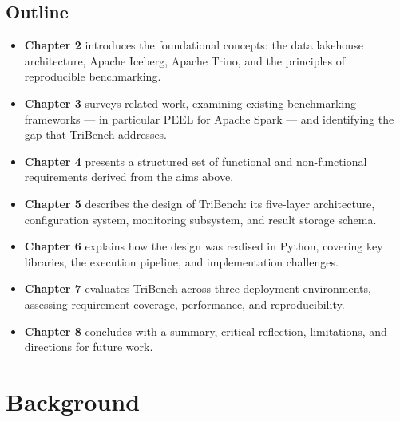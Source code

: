 \documentclass{l4proj}
\begin{document}
\section{Outline}
\label{sec:outline}

\begin{itemize}
  \item \textbf{Chapter 2} introduces the foundational concepts: the data lakehouse architecture, Apache Iceberg, Apache Trino, and the principles of reproducible benchmarking.
  \item \textbf{Chapter 3} surveys related work, examining existing benchmarking frameworks --- in particular PEEL for Apache Spark --- and identifying the gap that TriBench addresses.
  \item \textbf{Chapter 4} presents a structured set of functional and non-functional requirements derived from the aims above.
  \item \textbf{Chapter 5} describes the design of TriBench: its five-layer architecture, configuration system, monitoring subsystem, and result storage schema.
  \item \textbf{Chapter 6} explains how the design was realised in Python, covering key libraries, the execution pipeline, and implementation challenges.
  \item \textbf{Chapter 7} evaluates TriBench across three deployment environments, assessing requirement coverage, performance, and reproducibility.
  \item \textbf{Chapter 8} concludes with a summary, critical reflection, limitations, and directions for future work.
\end{itemize}

\chapter{Background}
\label{chap:background}
\end{document}
